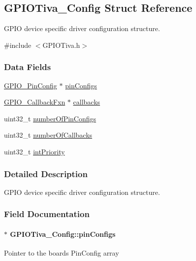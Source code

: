 \subsection{G\+P\+I\+O\+Tiva\+\_\+\+Config Struct Reference}
\label{struct_g_p_i_o_tiva___config}


G\+P\+I\+O device specific driver configuration structure.  




{\ttfamily \#include $<$G\+P\+I\+O\+Tiva.\+h$>$}

\subsubsection*{Data Fields}
\begin{DoxyCompactItemize}
\item 
\hyperlink{_g_p_i_o_8h_a7f5d979226db633309b3fdc0f4a8aef6}{G\+P\+I\+O\+\_\+\+Pin\+Config} $\ast$ \hyperlink{struct_g_p_i_o_tiva___config_ad6ae62f641912a5e19278241550cede5}{pin\+Configs}
\item 
\hyperlink{_g_p_i_o_8h_a033bc79f1a530381da2b74711e6b8971}{G\+P\+I\+O\+\_\+\+Callback\+Fxn} $\ast$ \hyperlink{struct_g_p_i_o_tiva___config_ad6dbaf80b33e7d6d2284bee7c4de6fc1}{callbacks}
\item 
uint32\+\_\+t \hyperlink{struct_g_p_i_o_tiva___config_ab5a7de155e3541998a41e2bd3099be78}{number\+Of\+Pin\+Configs}
\item 
uint32\+\_\+t \hyperlink{struct_g_p_i_o_tiva___config_aea570ca02796368da46e0b8607851fd9}{number\+Of\+Callbacks}
\item 
uint32\+\_\+t \hyperlink{struct_g_p_i_o_tiva___config_af447c2e65c010edf1653477d27c71476}{int\+Priority}
\end{DoxyCompactItemize}


\subsubsection{Detailed Description}
G\+P\+I\+O device specific driver configuration structure. 

\subsubsection{Field Documentation}
\paragraph[{pin\+Configs}]{$\ast$ G\+P\+I\+O\+Tiva\+\_\+\+Config\+::pin\+Configs}\label{struct_g_p_i_o_tiva___config_ad6ae62f641912a5e19278241550cede5}
Pointer to the board\textquotesingle{}s Pin\+Config array 
